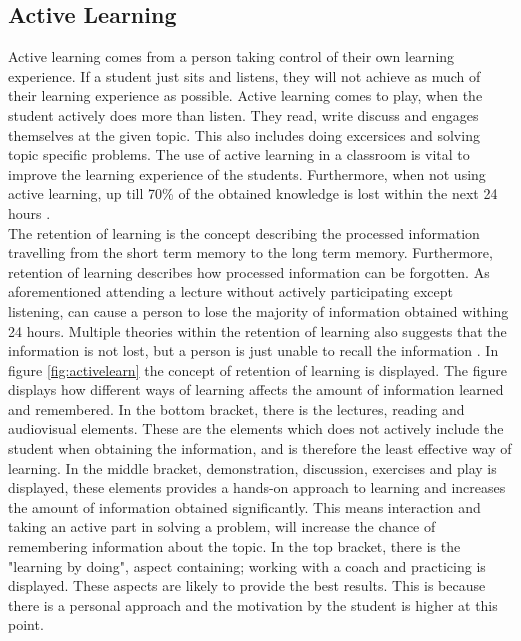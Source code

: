 	\subsection*{Active Learning}
	Active learning comes from a person taking control of their own learning experience. If a student just sits and listens, they will not achieve as much of their learning experience as possible. Active learning comes to play, when the student actively does more than listen. They read, write discuss and engages themselves at the given topic. This also includes doing excersices and solving topic specific problems\cite{activelearning}. The use of active learning in a classroom is vital to improve the learning experience of the students. Furthermore, when not using active learning, up till 70\% of the obtained knowledge is lost within the next 24 hours \cite{learning}.\\
	
	The retention of learning is the concept describing the processed information travelling from the short term memory to the long term memory. Furthermore, retention of learning describes how processed information can be forgotten. As aforementioned attending a lecture without actively participating except listening, can cause a person to lose the majority of information obtained withing 24 hours. Multiple theories within the retention of learning also suggests that the information is not lost, but a person is just unable to recall the information \cite{retention}.
	In figure \ref{fig:activelearn} the concept of retention of learning is displayed. The figure displays how different ways of learning affects the amount of information learned and remembered. In the bottom bracket, there is the lectures, reading and audiovisual elements. These are the elements which does not actively include the student when obtaining the information, and is therefore the least effective way of learning. In the middle bracket, demonstration, discussion, exercises and play is displayed, these elements provides a hands-on approach to learning and increases the amount of information obtained significantly. This means interaction and taking an active part in solving a problem, will increase the chance of remembering information about the topic. In the top bracket, there is the "learning by doing", aspect containing; working with a coach and practicing is displayed. These aspects are likely to provide the best results. This is because there is a personal approach and the motivation by the student is higher at this point\cite{retention}. 
	
